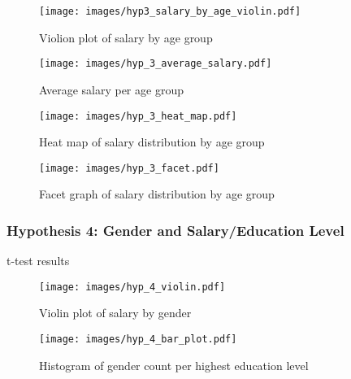 \begin{figure}[H]
    \centering
    \texttt{[image: images/hyp3\_salary\_by\_age\_violin.pdf]} %
    \caption{Violion plot of salary by age group}
    \label{fig:violion plot of salary by age group}
\end{figure}

\begin{figure}[H]
    \centering
    \texttt{[image: images/hyp\_3\_average\_salary.pdf]} %
    \caption{Average salary per age group}
    \label{fig:average salary per age group}
\end{figure}

\begin{figure}[H]
    \centering
    \texttt{[image: images/hyp\_3\_heat\_map.pdf]} %
    \caption{Heat map of salary distribution by age group}
    \label{fig:salary distribution heat map}
\end{figure}

\begin{figure}[H]
    \centering
    \texttt{[image: images/hyp\_3\_facet.pdf]} %
    \caption{Facet graph of salary distribution by age group}
    \label{fig:salary distribution facet}
\end{figure}

\subsubsection{Hypothesis 4: Gender and Salary/Education Level}

\begin{table}[H]
    \centering
    \caption{t-test results}
    \label{tab:t-test results}
    \begin{minipage}{\columnwidth}
        
    \end{minipage}
\end{table}

\begin{figure}[H]
    \centering
    \texttt{[image: images/hyp\_4\_violin.pdf]} %
    \caption{Violin plot of salary by gender}
    \label{fig:violin plot of salary by gender}
\end{figure}

\begin{figure}[H]
    \centering
    \texttt{[image: images/hyp\_4\_bar\_plot.pdf]} %
    \caption{Histogram of gender count per highest education level}
    \label{fig:histogram of gender by education level}
\end{figure}

